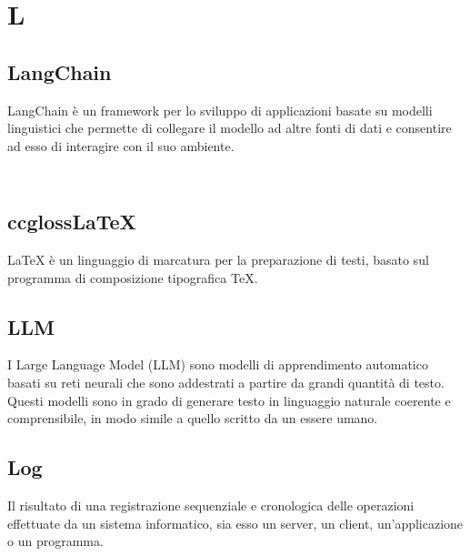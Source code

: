 \chapter{L}

\section{LangChain}
LangChain è un framework per lo sviluppo di applicazioni basate su modelli linguistici che permette di collegare il modello ad altre fonti di dati e consentire ad esso di interagire con il suo ambiente.

\section{\\ccgloss{LaTeX}}
LaTeX è un linguaggio di marcatura per la preparazione di testi, basato sul programma di composizione tipografica \TeX.

\section{LLM}\label{sec:Large Language Model}
I Large Language Model (LLM) sono modelli di apprendimento automatico basati su reti neurali che sono addestrati a partire da grandi quantità di testo. Questi modelli sono in grado di generare testo in linguaggio naturale coerente e comprensibile, in modo simile a quello scritto da un essere umano.

\section{Log}
Il risultato di una registrazione sequenziale e cronologica delle operazioni effettuate da un sistema informatico, sia esso un server, un client, un'applicazione o un programma.
